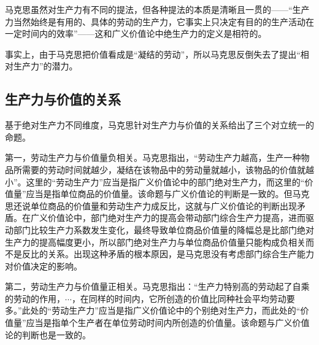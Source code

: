 马克思虽然对生产力有不同的提法，但各种提法的本质是清晰且一贯的\cite{YangQiaoYuShengChanLiGaiNianCongSiMiDaoMaKeSiDeSiXiangPuXi2013}\cite{DingXiaoPingZhengQueLiJieMaKeSiZhuYiDeShengChanLiGaiNian2021}——“生产力当然始终是有用的、具体的劳动的生产力，它事实上只决定有目的的生产活动在一定时间内的效率”\cite[59]{ZhongGongZhongYangMaKeSiEnGeSiLieNingSiDaLinZhuZuoBianYiJuMaKeSiEnGeSiWenJiDi5Juan2009}——这和广义价值论中绝生产力的定义是相符的。

事实上，由于马克思把价值看成是“凝结的劳动”\cite[51]{ZhongGongZhongYangMaKeSiEnGeSiLieNingSiDaLinZhuZuoBianYiJuMaKeSiEnGeSiWenJiDi5Juan2009}，所以马克思反倒失去了提出“相对生产力”的潜力。

\subsection{生产力与价值的关系}

基于绝对生产力不同维度，马克思针对生产力与价值的关系给出了三个对立统一的命题\cite[273]{CaiJiMingCongGuDianZhengZhiJingJiXueDaoZhongGuoTeSeSheHuiZhuYiZhengZhiJingJiXueJiYuZhongGuoShiJiaoDeZhengZhiJingJiXueYanBianShangCe2023}。

第一，劳动生产力与价值量负相关。马克思指出，“劳动生产力越高，生产一种物品所需要的劳动时间就越少，凝结在该物品中的劳动量就越小，该物品的价值就越小”\cite[53]{ZhongGongZhongYangMaKeSiEnGeSiLieNingSiDaLinZhuZuoBianYiJuMaKeSiEnGeSiWenJiDi5Juan2009}。这里的“劳动生产力”应当是指广义价值论中的部门绝对生产力，而这里的“价值量”应当是指单位商品的价值量\cite[273]{CaiJiMingCongGuDianZhengZhiJingJiXueDaoZhongGuoTeSeSheHuiZhuYiZhengZhiJingJiXueJiYuZhongGuoShiJiaoDeZhengZhiJingJiXueYanBianShangCe2023}。该命题与广义价值论的判断是一致的。但马克思还说单位商品的价值量和劳动生产力成反比\cite[53-54]{ZhongGongZhongYangMaKeSiEnGeSiLieNingSiDaLinZhuZuoBianYiJuMaKeSiEnGeSiWenJiDi5Juan2009}，这就与广义价值论的判断出现矛盾。在广义价值论中，部门绝对生产力的提高会带动部门综合生产力提高，进而驱动部门比较生产力系数发生变化，最终导致单位商品价值量的降幅总是比部门绝对生产力的提高幅度更小，所以部门绝对生产力与单位商品价值量只能构成负相关而不是反比的关系\cite[274, 282]{CaiJiMingCongGuDianZhengZhiJingJiXueDaoZhongGuoTeSeSheHuiZhuYiZhengZhiJingJiXueJiYuZhongGuoShiJiaoDeZhengZhiJingJiXueYanBianShangCe2023}。出现这种矛盾的根本原因，是马克思没有考虑部门综合生产能力对价值决定的影响。

第二，劳动生产力与价值量正相关。马克思指出：“生产力特别高的劳动起了自乘的劳动的作用，$\cdots$，在同样的时间内，它所创造的价值比同种社会平均劳动要多。”\cite[370]{ZhongGongZhongYangMaKeSiEnGeSiLieNingSiDaLinZhuZuoBianYiJuMaKeSiEnGeSiWenJiDi5Juan2009}此处的“劳动生产力”应当是指广义价值论中的个别绝对生产力，而此处的“价值量”应当是指单个生产者在单位劳动时间内所创造的价值量\cite[273]{CaiJiMingCongGuDianZhengZhiJingJiXueDaoZhongGuoTeSeSheHuiZhuYiZhengZhiJingJiXueJiYuZhongGuoShiJiaoDeZhengZhiJingJiXueYanBianShangCe2023}。该命题与广义价值论的判断也是一致的。

